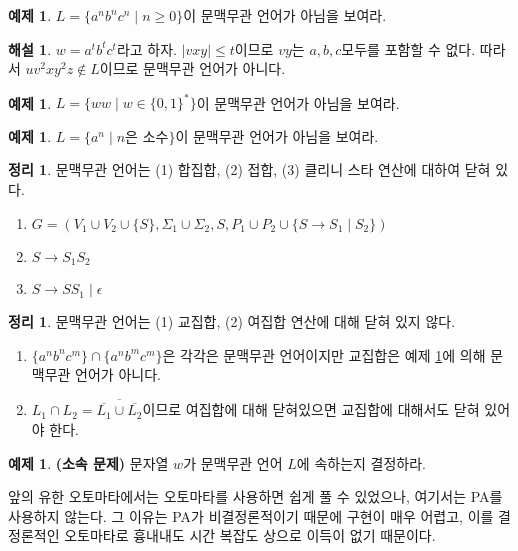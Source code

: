 \documentclass[b5paper, 11pt]{book}
\theoremstyle{definition}
\newtheorem{thm}[defn]{정리}
\newtheorem{ex}[defn]{예제}
\newtheorem*{ans*}{해설}
\newenvironment{pf*}{\pushQED{\qed}\pf}
{\popQED\endpf}
\begin{document}
\begin{ex} \label{anbncn}
    $L = \{a^n b^n c^n \;\vert\; n \ge 0 \}$이 문맥무관 언어가 아님을 보여라. 
\end{ex}
\begin{ans*}
    $w = a^t b^t c^t$라고 하자. $\vert vxy \vert \le t$이므로 $vy$는 $a,b,c$모두를 포함할 수 없다. 따라서 $uv^2 x y^2 z \notin L$이므로 문맥무관 언어가 아니다. 
\end{ans*}
\begin{ex}
    $L = \{ww \;\vert\; w \in \{0,1\}^*\}$이 문맥무관 언어가 아님을 보여라. 
\end{ex}
\begin{ex}
    $L = \{a^n \;\vert\; n \text{은 소수}\}$이 문맥무관 언어가 아님을 보여라.
\end{ex}
\begin{thm}
    문맥무관 언어는 (1) 합집합, (2) 접합, (3) 클리니 스타 연산에 대하여 닫혀 있다.
\end{thm}
\begin{pf*}
    \begin{enumerate}
        \item $G = (V_1 \cup V_2 \cup \{S\}, \Sigma_1 \cup \Sigma_2, S, P_1 \cup P_2 \cup \{S \rightarrow S_1 \;\vert\; S_2\})$
        \item $S \rightarrow S_1S_2$
        \item $S \rightarrow SS_1 \;\vert\; \epsilon$
    \end{enumerate}
\end{pf*}
\begin{thm}
    문맥무관 언어는 (1) 교집합, (2) 여집합 연산에 대해 닫혀 있지 않다. 
\end{thm}
\begin{pf*}
    \begin{enumerate}
        \item $\{a^n b^n c^m\} \cap \{a^n b^m c^m\}$은 각각은 문맥무관 언어이지만 교집합은 예제 \ref{anbncn}에 의해 문맥무관 언어가 아니다. \item $L_1 \cap L_2 = \overline{\overline{L_1} \cup \overline{L_2}}$이므로 여집합에 대해 닫혀있으면 교집합에 대해서도 닫혀 있어야 한다. 
    \end{enumerate}
\end{pf*}
\begin{ex}
    \textbf{(소속 문제)} 문자열 $w$가 문맥무관 언어 $L$에 속하는지 결정하라.     
\end{ex}
앞의 유한 오토마타에서는 오토마타를 사용하면 쉽게 풀 수 있었으나, 여기서는 PA를 사용하지 않는다. 그 이유는 PA가 비결정론적이기 때문에 구현이 매우 어렵고, 이를 결정론적인 오토마타로 흉내내도 시간 복잡도 상으로 이득이 없기 때문이다.  \\
\end{document}
